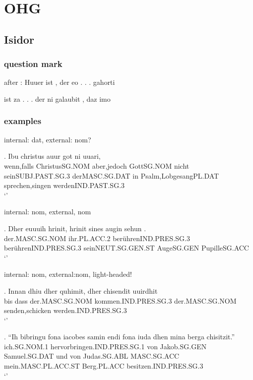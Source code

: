 
\chapter{OHG}

\section{Isidor}

\subsection{question mark}

after : Huuer ist , der eo . . . gahorti

ist za . . . der ni galaubit , daz imo



\subsection{examples}



internal: dat, external: nom?

\exg. Ibu christus auur got ni uuari,     \\
wenn,falls ChristusSG.NOM aber,jedoch GottSG.NOM nicht seinSUBJ.PAST.SG.3 derMASC.SG.DAT in Psalm,LobgesangPL.DAT sprechen,singen werdenIND.PAST.SG.3\\
`' 


internal: nom, external, nom

\exg. Dher euuuih hrinit, hrinit sines augin sehun .\\
 der.MASC.SG.NOM ihr.PL.ACC.2 berührenIND.PRES.SG.3 berührenIND.PRES.SG.3 seinNEUT.SG.GEN.ST AugeSG.GEN PupilleSG.ACC\\
`' 


internal: nom, external:nom, light-headed!

\exg. Innan dhiu dher quhimit, dher chisendit uuirdhit\\
bis dass der.MASC.SG.NOM kommen.IND.PRES.SG.3  der.MASC.SG.NOM senden,schicken werden.IND.PRES.SG.3\\
`' 


\exg. ``Ih bibringu fona iacobes samin endi fona iuda dhen mina berga chisitzit.''\\
ich.SG.NOM.1 hervorbringen.IND.PRES.SG.1 von Jakob.SG.GEN Samuel.SG.DAT und von Judas.SG.ABL MASC.SG.ACC mein.MASC.PL.ACC.ST Berg.PL.ACC besitzen.IND.PRES.SG.3\\
`' \label{ex:ohg-acc-nom}



